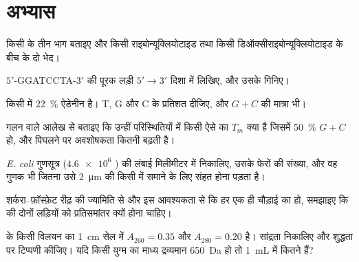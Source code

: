 \section{अभ्यास}

\begin{exercise}[$\star$]\label{exo:b1:nucleic-acids:1}
किसी  के तीन भाग बताइए और किसी राइबोन्यूक्लियोटाइड तथा
किसी डिऑक्सीराइबोन्यूक्लियोटाइड के बीच के दो भेद।
\end{exercise}

\begin{exercise}[$\star$]\label{exo:b1:nucleic-acids:2}
$5'$-GGATCCTA-$3'$ की पूरक लड़ी $5' \to 3'$ दिशा में लिखिए,
और उसके  गिनिए।
\end{exercise}

\begin{exercise}[$\star$]\label{exo:b1:nucleic-acids:3}
किसी  में \qty{22}{\%} ऐडेनीन है। T, G और C के प्रतिशत दीजिए, और
$G + C$ की मात्रा भी।
\end{exercise}

\begin{exercise}[$\star$]\label{exo:b1:nucleic-acids:4}
गलन वाले आलेख से बताइए कि उन्हीं परिस्थितियों में किसी ऐसे  का $T_m$
क्या है जिसमें \qty{50}{\%} $G + C$ हो, और पिघलने पर अवशोषकता कितनी
बढ़ती है।
\end{exercise}

\begin{exercise}[$\star\star$]\label{exo:b1:nucleic-acids:5}
\emph{E. coli} गुणसूत्र ($\num{4.6e6}$ ) की लंबाई
मिलीमीटर में निकालिए, उसके फेरों की संख्या, और वह गुणक भी जितना उसे
\qty{2}{\micro m} की किसी  में समाने के लिए संहत होना पड़ता है।
\end{exercise}

\begin{exercise}[$\star\star$]\label{exo:b1:nucleic-acids:6}
शर्करा--फ़ॉस्फ़ेट रीढ़ की ज्यामिति से और इस आवश्यकता से कि हर  एक ही चौड़ाई का हो, समझाइए कि  की दोनों लड़ियों को प्रतिसमांतर
क्यों होना चाहिए।
\end{exercise}

\begin{exercise}[$\star\star$]\label{exo:b1:nucleic-acids:7}
 के किसी विलयन का \qty{1}{cm} सेल में $A_{260} = 0.35$ और
$A_{280} = 0.20$ है। सांद्रता निकालिए और शुद्धता पर टिप्पणी कीजिए।
यदि किसी युग्म का माध्य द्रव्यमान \qty{650}{Da} हो तो \qty{1}{mL} में
कितने  हैं?
\end{exercise}

